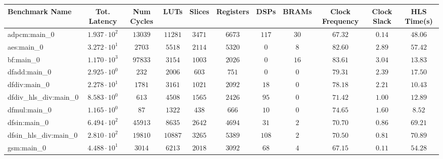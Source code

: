 \begin{tabular}{|l|c|c|c|c|c|c|c|c|c|c|}
\hline
Benchmark Name          & Tot. Latency           & Num Cycles & LUTs      & Slices    & Registers & DSPs    & BRAMs   & Clock Frequency & Clock Slack & HLS Time(s) \\
\hline
adpcm:main\_0           & $ 1.937 \cdot 10^{2} $ & $ 13039  $ & $ 11281 $ & $ 3471  $ & $ 6673  $ & $ 117 $ & $ 30  $ & $ 67.32       $ & $ 0.14    $ & $ 48.06   $ \\
aes:main\_0             & $ 3.272 \cdot 10^{1} $ & $ 2703   $ & $ 5518  $ & $ 2114  $ & $ 5320  $ & $ 0   $ & $ 8   $ & $ 82.60       $ & $ 2.89    $ & $ 57.42   $ \\
bf:main\_0              & $ 1.170 \cdot 10^{3} $ & $ 97833  $ & $ 3154  $ & $ 1003  $ & $ 2026  $ & $ 0   $ & $ 16  $ & $ 83.61       $ & $ 3.04    $ & $ 13.83   $ \\
dfadd:main\_0           & $ 2.925 \cdot 10^{0} $ & $ 232    $ & $ 2006  $ & $ 603   $ & $ 751   $ & $ 0   $ & $ 0   $ & $ 79.31       $ & $ 2.39    $ & $ 17.50   $ \\
dfdiv:main\_0           & $ 2.278 \cdot 10^{1} $ & $ 1781   $ & $ 3161  $ & $ 1021  $ & $ 2092  $ & $ 18  $ & $ 0   $ & $ 78.18       $ & $ 2.21    $ & $ 10.43   $ \\
dfdiv\_hls\_div:main\_0 & $ 8.583 \cdot 10^{0} $ & $ 613    $ & $ 4508  $ & $ 1565  $ & $ 2426  $ & $ 95  $ & $ 0   $ & $ 71.42       $ & $ 1.00    $ & $ 12.89   $ \\
dfmul:main\_0           & $ 1.165 \cdot 10^{0} $ & $ 87     $ & $ 1322  $ & $ 438   $ & $ 666   $ & $ 10  $ & $ 0   $ & $ 74.65       $ & $ 1.60    $ & $ 8.52    $ \\
dfsin:main\_0           & $ 6.494 \cdot 10^{2} $ & $ 45913  $ & $ 8635  $ & $ 2642  $ & $ 4694  $ & $ 31  $ & $ 2   $ & $ 70.70       $ & $ 0.86    $ & $ 69.21   $ \\
dfsin\_hls\_div:main\_0 & $ 2.810 \cdot 10^{2} $ & $ 19810  $ & $ 10887 $ & $ 3265  $ & $ 5389  $ & $ 108 $ & $ 2   $ & $ 70.50       $ & $ 0.81    $ & $ 70.89   $ \\
gsm:main\_0             & $ 4.488 \cdot 10^{1} $ & $ 3014   $ & $ 6213  $ & $ 2018  $ & $ 3092  $ & $ 68  $ & $ 4   $ & $ 67.15       $ & $ 0.11    $ & $ 54.28   $ \\

\end{tabular}
